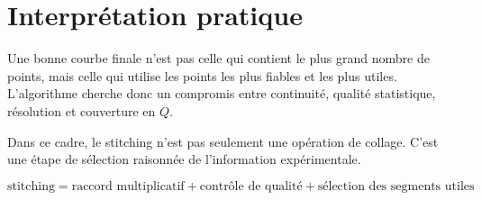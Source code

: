 \documentclass[11pt,a4paper]{article}
\begin{document}
\section{Interprétation pratique}

Une bonne courbe finale n'est pas celle qui contient le plus grand nombre de
points, mais celle qui utilise les points les plus fiables et les plus utiles.
L'algorithme cherche donc un compromis entre continuité, qualité statistique,
résolution et couverture en $Q$.

Dans ce cadre, le stitching n'est pas seulement une opération de collage. C'est
une étape de sélection raisonnée de l'information expérimentale.

\[
\boxed{
    \text{stitching} =
    \text{raccord multiplicatif}
    +
    \text{contrôle de qualité}
    +
    \text{sélection des segments utiles}
}
\]
\end{document}
